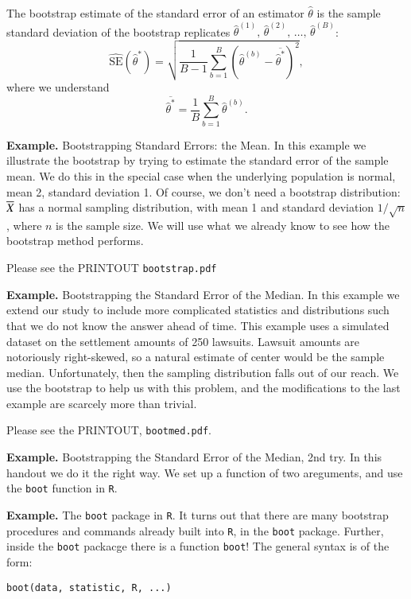 \documentclass[11pt,english]{scrbook}
\begin{document}
The bootstrap estimate of the standard error of an estimator \(\hat{\theta}\) is the sample standard deviation of the bootstrap replicates \(\hat{\theta}^{(1)},\, \hat{\theta}^{(2)},\, \ldots,\,\hat{\theta}^{(B)}\):
\[
\widehat{\mathrm{SE}}(\hat{\theta}^{\ast})=\sqrt{\frac{1}{B-1}\sum_{b=1}^{B} \left( \hat{\theta}^{(b)} - \overline{\hat{\theta}^{\ast}} \right)^{2}},
\]
where we understand
\[
\overline{\hat{\theta}^{\ast}} = \frac{1}{B}\sum_{b=1}^{B} \hat{\theta}^{(b)}.
\]

\textbf{Example.} Bootstrapping Standard Errors: the Mean.  In this example we illustrate the bootstrap by trying to estimate the standard error of the sample mean. We do this in the special case when the underlying population is normal, mean 2, standard deviation 1. Of course, we don't need a bootstrap distribution: \(\overline{X}\) has a normal sampling distribution, with mean 1 and standard deviation \(1/\sqrt{n}\), where \(n\) is the sample size. We will use what we already know to see how the bootstrap method performs.

Please see the PRINTOUT \texttt{bootstrap.pdf}


\textbf{Example.} Bootstrapping the Standard Error of the Median. In this example we extend our study to include more complicated statistics and distributions such that we do not know the answer ahead of time. This example uses a simulated dataset on the settlement amounts of 250 lawsuits. Lawsuit amounts are notoriously right-skewed, so a natural estimate of center would be the sample median. Unfortunately, then the sampling distribution falls out of our reach. We use the bootstrap to help us with this problem, and the modifications to the last example are scarcely more than trivial.

Please see the PRINTOUT, \texttt{bootmed.pdf}.  

\textbf{Example.} Bootstrapping the Standard Error of the Median, 2nd try.  In this handout we do it the right way.  We set up a function of two areguments, and use the \texttt{boot} function in \texttt{R}. 


\textbf{Example.} The \texttt{boot} package in \texttt{R}. It turns out that there are many bootstrap procedures and commands already built into \texttt{R}, in the \texttt{boot} package. Further, inside the \texttt{boot} packacge there is a function \texttt{boot}! The general syntax is of the form:

\begin{verbatim}
boot(data, statistic, R, ...)
\end{verbatim}
\end{document}
